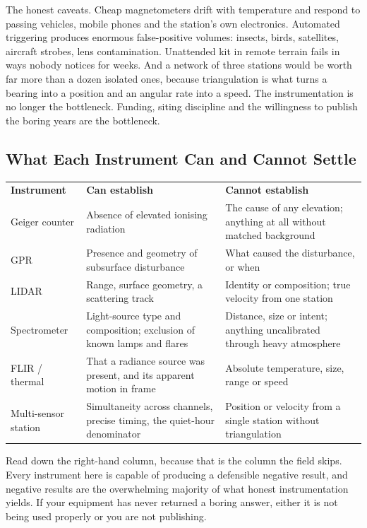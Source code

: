 The honest caveats. Cheap magnetometers drift with temperature and respond to passing vehicles,
mobile phones and the station's own electronics. Automated triggering produces enormous
false-positive volumes: insects, birds, satellites, aircraft strobes, lens contamination.
Unattended kit in remote terrain fails in ways nobody notices for weeks. And a network of three
stations would be worth far more than a dozen isolated ones, because triangulation is what turns
a bearing into a position and an angular rate into a speed. The instrumentation is no longer the
bottleneck. Funding, siting discipline and the willingness to publish the boring years are the
bottleneck.

\subsection{What Each Instrument Can and Cannot Settle}

\begin{center}\small
\begin{tabular}{@{}p{}p{}p{}@{}}
\textbf{Instrument} & \textbf{Can establish} & \textbf{Cannot establish}\\[3pt]
Geiger counter & Absence of elevated ionising radiation & The cause of any elevation; anything
at all without matched background\\[2pt]
GPR & Presence and geometry of subsurface disturbance & What caused the disturbance, or
when\\[2pt]
LIDAR & Range, surface geometry, a scattering track & Identity or composition; true velocity
from one station\\[2pt]
Spectrometer & Light-source type and composition; exclusion of known lamps and flares & Distance,
size or intent; anything uncalibrated through heavy atmosphere\\[2pt]
FLIR / thermal & That a radiance source was present, and its apparent motion in frame & Absolute
temperature, size, range or speed\\[2pt]
Multi-sensor station & Simultaneity across channels, precise timing, the quiet-hour denominator &
Position or velocity from a single station without triangulation\\
\end{tabular}
\end{center}

Read down the right-hand column, because that is the column the field skips. Every instrument
here is capable of producing a defensible negative result, and negative results are the
overwhelming majority of what honest instrumentation yields. If your equipment has never
returned a boring answer, either it is not being used properly or you are not publishing.

